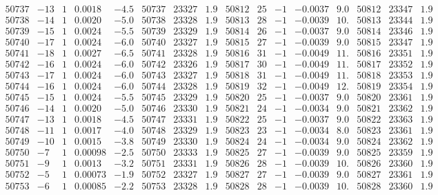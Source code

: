 \documentclass[11pt,reqno,a4letter]{article}
\numberwithin{figure}{section}
\numberwithin{table}{section}
\theoremstyle{plain}
\numberwithin{theorem}{section}
\theoremstyle{definition}
\begin{document}
\begin{table}[ht]
\begin{equation*}
{\begin{array}{ccccc|ccc||ccccc|ccc}
50737 & -13 & 1 & 0.0018 & -4.5 & 50737 & 23327 & 1.9 & 50812 & 25 & -1 & -0.0037 & 9.0 & 50812 & 23347 & 1.9  \\
50738 & -14 & 1 & 0.0020 & -5.0 & 50738 & 23328 & 1.9 & 50813 & 28 & -1 & -0.0039 & 10. & 50813 & 23344 & 1.9  \\
50739 & -15 & 1 & 0.0024 & -5.5 & 50739 & 23329 & 1.9 & 50814 & 26 & -1 & -0.0037 & 9.0 & 50814 & 23346 & 1.9  \\
50740 & -17 & 1 & 0.0024 & -6.0 & 50740 & 23327 & 1.9 & 50815 & 27 & -1 & -0.0039 & 9.0 & 50815 & 23347 & 1.9  \\
50741 & -18 & 1 & 0.0027 & -6.5 & 50741 & 23328 & 1.9 & 50816 & 31 & -1 & -0.0049 & 11. & 50816 & 23351 & 1.9  \\
50742 & -16 & 1 & 0.0024 & -6.0 & 50742 & 23326 & 1.9 & 50817 & 30 & -1 & -0.0049 & 11. & 50817 & 23352 & 1.9  \\
50743 & -17 & 1 & 0.0024 & -6.0 & 50743 & 23327 & 1.9 & 50818 & 31 & -1 & -0.0049 & 11. & 50818 & 23353 & 1.9  \\
50744 & -16 & 1 & 0.0024 & -6.0 & 50744 & 23328 & 1.9 & 50819 & 32 & -1 & -0.0049 & 12. & 50819 & 23354 & 1.9  \\
50745 & -15 & 1 & 0.0024 & -5.5 & 50745 & 23329 & 1.9 & 50820 & 25 & -1 & -0.0037 & 9.0 & 50820 & 23361 & 1.9  \\
50746 & -14 & 1 & 0.0020 & -5.0 & 50746 & 23330 & 1.9 & 50821 & 24 & -1 & -0.0034 & 9.0 & 50821 & 23362 & 1.9  \\
50747 & -13 & 1 & 0.0018 & -4.5 & 50747 & 23331 & 1.9 & 50822 & 25 & -1 & -0.0037 & 9.0 & 50822 & 23363 & 1.9  \\
50748 & -11 & 1 & 0.0017 & -4.0 & 50748 & 23329 & 1.9 & 50823 & 23 & -1 & -0.0034 & 8.0 & 50823 & 23361 & 1.9  \\
50749 & -10 & 1 & 0.0015 & -3.8 & 50749 & 23330 & 1.9 & 50824 & 24 & -1 & -0.0034 & 9.0 & 50824 & 23362 & 1.9  \\
50750 & -7 & 1 & 0.00098 & -2.5 & 50750 & 23333 & 1.9 & 50825 & 27 & -1 & -0.0039 & 9.0 & 50825 & 23359 & 1.9  \\
50751 & -9 & 1 & 0.0013 & -3.2 & 50751 & 23331 & 1.9 & 50826 & 28 & -1 & -0.0039 & 10. & 50826 & 23360 & 1.9  \\
50752 & -5 & 1 & 0.00073 & -1.9 & 50752 & 23327 & 1.9 & 50827 & 27 & -1 & -0.0039 & 9.0 & 50827 & 23361 & 1.9  \\
50753 & -6 & 1 & 0.00085 & -2.2 & 50753 & 23328 & 1.9 & 50828 & 28 & -1 & -0.0039 & 10. & 50828 & 23360 & 1.9  \\

\end{array}}
\end{equation*}
\end{table}
\end{document}
